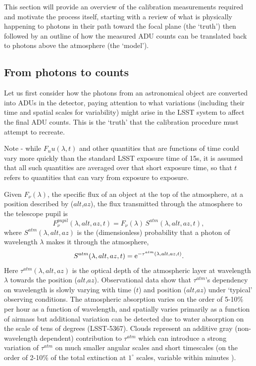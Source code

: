 \documentclass[12pt,preprint]{aastex}
\begin{document}
This section will provide an overview of the calibration measurements
required and motivate the process itself, starting with a review of
what is physically happening to photons in their path toward the focal
plane (the `truth') then followed by an outline of how the measured
ADU counts can be translated back to photons above the atmosphere (the
`model').

\subsection{From photons to counts}

Let us first consider how the photons from an astronomical object are
converted into ADUs in the detector, paying attention to what
variations (including their time and spatial scales for variability)
might arise in the LSST system to affect the final ADU counts. This is
the `truth' that the calibration procedure must attempt to recreate. 

Note - while $F_nu(\lambda,t)$ and other quantities that are functions of time
could vary more quickly than the standard LSST exposure time of 15s, it is
assumed that all such quantities are averaged over that short exposure time, so 
that $t$ refers to quantities that can vary from exposure to exposure. 

Given $F_\nu(\lambda)$, the specific flux of an object at
the top of the atmosphere, at a position described by ($alt$,$az$),
the flux transmitted through the atmosphere to the telescope pupil is
\begin{equation}
\label{eqn:Fpupil}
   F_\nu^{pupil}(\lambda,alt,az,t) = F_\nu(\lambda) \, S^{atm}(\lambda,alt,az,t),
\end{equation}
where $S^{atm}(\lambda,alt,az)$ is the (dimensionless) probability that a photon of 
wavelength $\lambda$ makes it through the atmosphere,
\begin{equation}
\label{eqn:atmTau}
   S^{atm}(\lambda,alt,az,t)   = {\rm e}^{-\tau^{atm}(\lambda,alt,az,t)}.
\end{equation}
Here $\tau^{atm}(\lambda,alt,az)$ is the optical depth of the
atmospheric layer at wavelength $\lambda$ towards the position
($alt$,$az$).  Observational data show that $\tau^{atm}$'s dependency
on wavelength is slowly varying with time ($t$) and position
($alt$,$az$) under `typical' observing conditions. The atmospheric
absorption varies on the order of 5-10\% per hour as a function of
wavelength, and spatially varies primarily as a function of airmass
but additional variation can be detected due to water absorption on
the scale of tens of degrees (LSST-5367).  Clouds represent an
additive gray (non-wavelength dependent) contribution to $\tau^{atm}$
which can introduce a strong variation of $\tau^{atm}$ on much smaller
angular scales and short timescales (on the order of 2-10\% of the
total extinction at $1^{\circ}$ scales, variable within minutes
\citep{Ivezic2007}).
\end{document}
